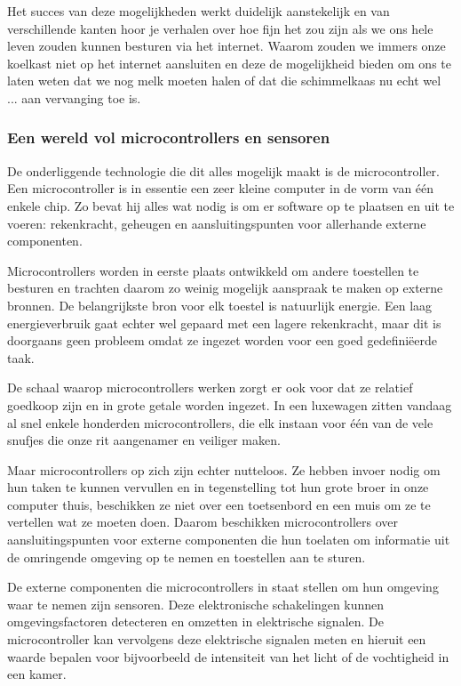 \documentclass[DIV=calc,paper=a4,fontsize=11pt,twocolumn,draft]{scrartcl}
\newcommand{\heading}[1]{
\subsubsection*{#1}
\vspace{-2mm}
}
\begin{document}
Het succes van deze mogelijkheden werkt duidelijk aanstekelijk en van
verschillende kanten hoor je verhalen over hoe fijn het zou zijn als we ons
hele leven zouden kunnen besturen via het internet. Waarom zouden we immers
onze koelkast niet op het internet aansluiten en deze de mogelijkheid bieden om
ons te laten weten dat we nog melk moeten halen of dat die schimmelkaas nu echt
wel ... aan vervanging toe is.

\heading{Een wereld vol microcontrollers en sensoren}

De onderliggende technologie die dit alles mogelijk maakt is de
microcontroller. Een microcontroller is in essentie een zeer kleine computer in
de vorm van \'e\'en enkele chip. Zo bevat hij alles wat nodig is om er software
op te plaatsen en uit te voeren: rekenkracht, geheugen en aansluitingspunten
voor allerhande externe componenten.

Microcontrollers worden in eerste plaats ontwikkeld om andere toestellen te
besturen en trachten daarom zo weinig mogelijk aanspraak te maken op externe
bronnen. De belangrijkste bron voor elk toestel is natuurlijk energie. Een laag
energieverbruik gaat echter wel gepaard met een lagere rekenkracht, maar dit is
doorgaans geen probleem omdat ze ingezet worden voor een goed gedefini\"eerde
taak.

De schaal waarop microcontrollers werken zorgt er ook voor dat ze relatief
goedkoop zijn en in grote getale worden ingezet. In een luxewagen zitten
vandaag al snel enkele honderden microcontrollers, die elk instaan voor \'e\'en
van de vele snufjes die onze rit aangenamer en veiliger maken.

Maar microcontrollers op zich zijn echter nutteloos. Ze hebben invoer nodig om
hun taken te kunnen vervullen en in tegenstelling tot hun grote broer in onze
computer thuis, beschikken ze niet over een toetsenbord en een muis om ze te
vertellen wat ze moeten doen. Daarom beschikken microcontrollers over
aansluitingspunten voor externe componenten die hun toelaten om informatie uit
de omringende omgeving op te nemen en toestellen aan te sturen.

De externe componenten die microcontrollers in staat stellen om hun omgeving
waar te nemen zijn sensoren. Deze elektronische schakelingen kunnen
omgevingsfactoren detecteren en omzetten in elektrische signalen. De
microcontroller kan vervolgens deze elektrische signalen meten en hieruit een
waarde bepalen voor bijvoorbeeld de intensiteit van het licht of de vochtigheid
in een kamer.
\end{document}
